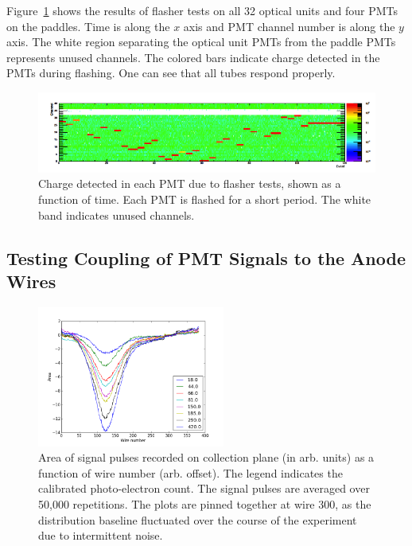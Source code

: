 Figure~\ref{fig:flasherresult} shows the results of flasher tests on all 32 optical units and four PMTs on the paddles.  Time is along the $x$ axis and PMT channel number is along the $y$ axis.  The white region separating the optical unit PMTs from the paddle PMTs represents unused channels.  The colored bars indicate charge detected in the PMTs during flashing.  One can see that all tubes respond properly.


\begin{figure}[t]
\centering 
\includegraphics[width=\textwidth]{./light_figures/flasherresult.png}
\caption{Charge detected in each PMT due to flasher tests, shown as a function of time.  Each PMT is flashed for a short period. The white band indicates unused channels. \label{fig:flasherresult}  }
\end{figure}



\subsection{Testing Coupling of PMT Signals to the Anode Wires}

\begin{figure}[t]
\centering 
\includegraphics[width=0.55\textwidth]{./light_figures/PMT_xtalk_PE_plot.png}
\caption{Area of signal pulses recorded on collection plane (in arb. units) as a function of wire number (arb. offset). The legend indicates the calibrated photo-electron count. The signal pulses are averaged over 50,000 repetitions. The plots are pinned together at wire 300, as the distribution baseline fluctuated over the course of the experiment due to intermittent noise.
 \label{fig:PMTxtalk}  }
\end{figure}

